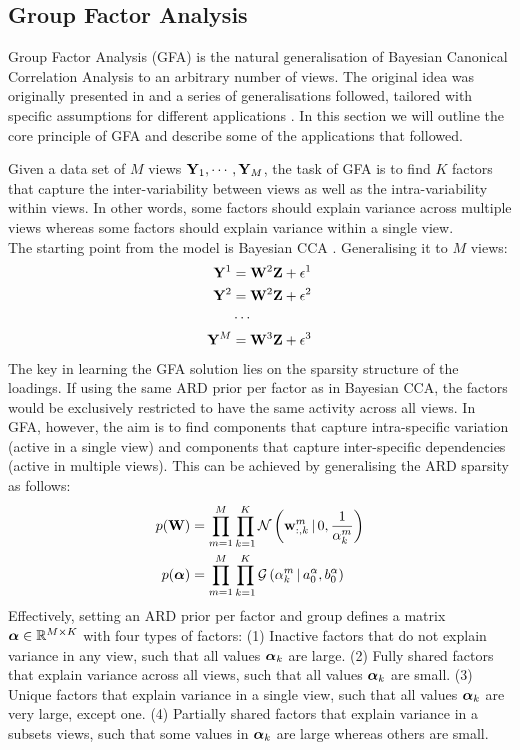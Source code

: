 \subsection{Group Factor Analysis}

Group Factor Analysis (GFA) is the natural generalisation of Bayesian Canonical Correlation Analysis to an arbitrary number of views.
The original idea was originally presented in \cite{Virtanen2012} and a series of generalisations followed, tailored with specific assumptions for different applications \cite{Klami2015,Leppaaho2017,Bunte2016,Khan2014,Zhao2016,Remes2015}. In this section we will outline the core principle of GFA and describe some of the applications that followed.

Given a data set of $M$ views ${\bf Y}_1, \cdots, {\bf Y}_M$, the task of GFA is to find $K$ factors that capture the inter-variability between views as well as the intra-variability within views. In other words, some factors should explain variance across multiple views whereas some factors should explain variance within a single view.\\
The starting point from the model is Bayesian CCA . Generalising it to $M$ views:
\begin{align*}
	{\bf Y}^{1} &= {\bf W}^{2} {\bf Z} + \epsilon^{1} \\
	{\bf Y}^{2} &= {\bf W}^{2} {\bf Z} + \epsilon^{2} \\
	& \cdots \\
	{\bf Y}^{M} &= {\bf W}^{3} {\bf Z} + \epsilon^{3}
\end{align*}
The key in learning the GFA solution lies on the sparsity structure of the loadings. If using the same ARD prior per factor as in Bayesian CCA, the factors would be exclusively restricted to have the same activity across all views. In GFA, however, the aim is to find components that capture intra-specific variation (active in a single view) and components that capture inter-specific dependencies (active in multiple views). This can be achieved by generalising the ARD sparsity as follows:
\begin{align}
	p({\bf W}) &= \prod_{m=1}^{M} \prod_{k=1}^{K} \mathcal{N}\left({\bf w}_{:,k}^m \,|\, 0,\frac{1}{\alpha_k^m}\right) \\
	p(\mbox{\boldmath $\alpha$}) &= \prod_{m=1}^{M} \prod_{k=1}^{K} \mathcal{G}\left(\alpha_k^m \,|\, a_0^\alpha, b_0^\alpha\right)
\end{align}
Effectively, setting an ARD prior per factor and group defines a matrix $\mbox{\boldmath $\alpha$} \in \mathbb{R}^{M \times K}$ with four types of factors: (1) Inactive factors that do not explain variance in any view, such that all values $\mbox{\boldmath $\alpha$}_k$ are large. (2) Fully shared factors that explain variance across all views, such that all values $\mbox{\boldmath $\alpha$}_k$ are small. (3) Unique factors that explain variance in a single view, such that all values $\mbox{\boldmath $\alpha$}_k$ are very large, except one. (4) Partially shared factors that explain variance in a subsets views, such that some values in $\mbox{\boldmath $\alpha$}_k$ are large whereas others are small.

